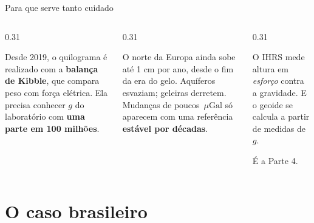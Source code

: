 \documentclass[aspectratio=169,11pt]{beamer}
\newcommand{\bnum}[1]{\textbf{\textcolor{mTeal}{#1}}}
\newcommand{\uGal}{\ensuremath{\,\mu\mathrm{Gal}}\xspace}
\begin{document}
\begin{frame}{Para que serve tanto cuidado}
  \begin{columns}[T]
    \begin{column}{0.31\textwidth}
      \begin{ideia}[title={O quilograma}]
        \small\raggedright Desde 2019, o quilograma é realizado com a \textbf{balança de Kibble}, que
        compara peso com força elétrica. Ela precisa conhecer $g$ do laboratório com
        \bnum{uma parte em 100 milhões}.
      \end{ideia}
    \end{column}
    \begin{column}{0.31\textwidth}
      \begin{ideia}[title={A Terra que muda}]
        \small\raggedright O norte da Europa ainda sobe até 1 cm por ano, desde o fim da era do gelo.
        Aquíferos esvaziam; geleiras derretem. Mudanças de poucos \uGal{} só aparecem com
        uma referência \bnum{estável por décadas}.
      \end{ideia}
    \end{column}
    \begin{column}{0.31\textwidth}
      \begin{ideia}[title={Geoide e altitudes}]
        \small\raggedright O IHRS mede altura em \emph{esforço} contra a gravidade. E o geoide se
        calcula a partir de medidas de $g$.
        \medskip

        \alert{É a Parte 4.}
      \end{ideia}
    \end{column}
  \end{columns}
\end{frame}

\section{O caso brasileiro}
\end{document}

